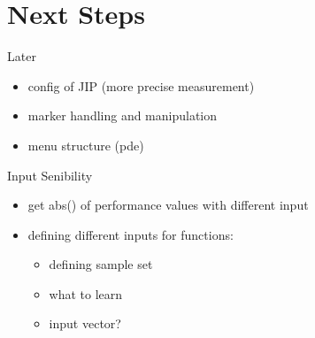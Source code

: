 \documentclass[11pt,aspectratio=169]{beamer}
\begin{document}
\section{Next Steps}

\begin{frame}{Later}
  \begin{itemize}
    \item config of JIP (more precise measurement)
    \item marker handling and manipulation
    \item menu structure (pde)
  \end{itemize}
\end{frame}

\begin{frame}{Input Senibility}
  \begin{itemize}
    \item get abs() of performance values with different input
    \item defining different inputs for functions:
    \begin{itemize}
      \item defining sample set
      \item what to learn
      \item input vector?
    \end{itemize}
  \end{itemize}
\end{frame}



\appendix
\end{document}
